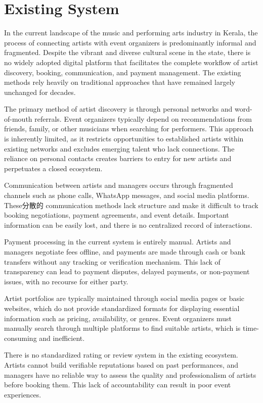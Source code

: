 \documentclass[12pt,a4paper]{report}
\begin{document}
\clearpage
{}
\setcounter{section}{0}
\section{Existing System}
In the current landscape of the music and performing arts industry in Kerala, the process of connecting artists with event organizers is predominantly informal and fragmented. Despite the vibrant and diverse cultural scene in the state, there is no widely adopted digital platform that facilitates the complete workflow of artist discovery, booking, communication, and payment management. The existing methods rely heavily on traditional approaches that have remained largely unchanged for decades.

The primary method of artist discovery is through personal networks and word-of-mouth referrals. Event organizers typically depend on recommendations from friends, family, or other musicians when searching for performers. This approach is inherently limited, as it restricts opportunities to established artists within existing networks and excludes emerging talent who lack connections. The reliance on personal contacts creates barriers to entry for new artists and perpetuates a closed ecosystem.

Communication between artists and managers occurs through fragmented channels such as phone calls, WhatsApp messages, and social media platforms. These分散的 communication methods lack structure and make it difficult to track booking negotiations, payment agreements, and event details. Important information can be easily lost, and there is no centralized record of interactions.

Payment processing in the current system is entirely manual. Artists and managers negotiate fees offline, and payments are made through cash or bank transfers without any tracking or verification mechanism. This lack of transparency can lead to payment disputes, delayed payments, or non-payment issues, with no recourse for either party.

Artist portfolios are typically maintained through social media pages or basic websites, which do not provide standardized formats for displaying essential information such as pricing, availability, or genres. Event organizers must manually search through multiple platforms to find suitable artists, which is time-consuming and inefficient.

There is no standardized rating or review system in the existing ecosystem. Artists cannot build verifiable reputations based on past performances, and managers have no reliable way to assess the quality and professionalism of artists before booking them. This lack of accountability can result in poor event experiences.
\end{document}
